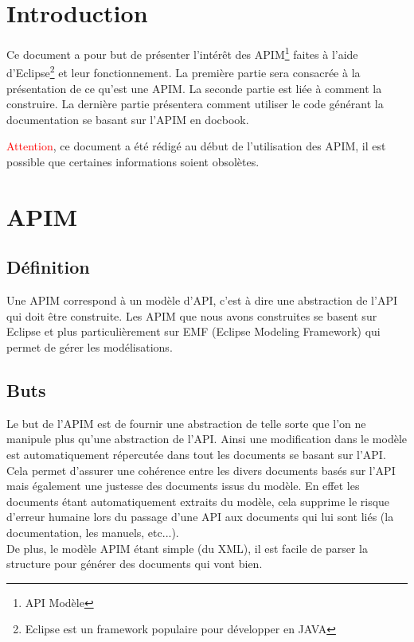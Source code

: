 \documentclass{article}
\begin{document}
\tableofcontents


\section*{Introduction}
Ce document a pour but de pr\'esenter l'int\'er\^et des APIM\footnote{API Mod\`ele} faites \`a l'aide d'Eclipse\footnote{Eclipse est un framework populaire pour d\'evelopper en JAVA} et leur fonctionnement. La premi\`ere partie sera consacr\'ee \`a la pr\'esentation de ce qu'est une APIM. La seconde partie est li\'ee \`a comment la construire. La derni\`ere partie pr\'esentera comment utiliser le code g\'en\'erant la documentation se basant sur l'APIM en docbook.

\textcolor{red}{Attention}, ce document a \'et\'e r\'edig\'e au d\'ebut de l'utilisation des APIM, il est possible que certaines informations soient obsol\`etes.


\section*{APIM}
\subsection*{D\'efinition}
Une APIM correspond \`a un mod\`ele d'API, c'est \`a dire une abstraction de l'API qui doit \^etre construite. Les APIM que nous avons construites se basent sur Eclipse et plus particuli\`erement sur EMF (Eclipse Modeling Framework) qui permet de g\'erer les mod\'elisations.
\subsection*{Buts}
Le but de l'APIM est de fournir une abstraction de telle sorte que l'on ne manipule plus qu'une abstraction de l'API. Ainsi une modification dans le mod\`ele est automatiquement r\'epercut\'ee dans tout les documents se basant sur l'API. Cela permet d'assurer une coh\'erence entre les divers documents bas\'es sur l'API mais \'egalement une justesse des documents issus du mod\`ele. En effet les documents \'etant automatiquement extraits du mod\`ele, cela supprime le risque d'erreur humaine lors du passage d'une API aux documents qui lui sont li\'es (la documentation, les manuels, etc...). \\
De plus, le mod\`ele APIM \'etant simple (du XML), il est facile de parser la structure pour g\'en\'erer des documents qui vont bien.
\end{document}
